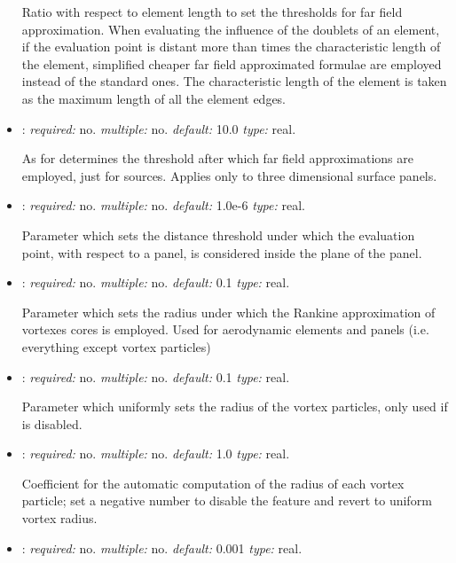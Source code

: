 \begin{itemize}
Ratio with respect to element length to set the thresholds for far field approximation. 
When evaluating the influence of the doublets of an element, 
if the evaluation point is distant more than  
times the characteristic length of the element, simplified cheaper far field 
approximated formulae are employed instead of the standard ones. 
The characteristic length of the element is taken as the maximum 
length of all the element edges.

\item {}: \textit{required:} no. 
\textit{multiple:} no. \textit{default:} 10.0 \textit{type:} real.

As for  determines the threshold 
after which far field approximations are employed, just for sources. 
Applies only to three dimensional surface panels. 

\item {}: \textit{required:} no. \textit{multiple:} no. 
\textit{default:} 1.0e-6 \textit{type:} real.

Parameter which sets the distance threshold under which the evaluation point, 
with respect to a panel, is considered inside the plane of the panel.

\item {}: \textit{required:} no. \textit{multiple:} no. 
\textit{default:} 0.1 \textit{type:} real.

Parameter which sets the radius under which the Rankine approximation of 
vortexes cores is employed. Used for aerodynamic elements and panels 
(i.e. everything except vortex particles)

\item {}: \textit{required:} no. \textit{multiple:} no. 
\textit{default:} 0.1 \textit{type:} real.

Parameter which uniformly sets the radius of the vortex particles, only used if  is disabled.

\item {}: \textit{required:} no. \textit{multiple:} no. \textit{default:} 1.0 \textit{type:} real.

Coefficient for the automatic computation of the radius of each vortex particle; set a negative number to disable the feature and revert to uniform vortex radius. 

\item {}: \textit{required:} no. \textit{multiple:} no. 
\textit{default:} 0.001 \textit{type:} real. 


\end{itemize}
